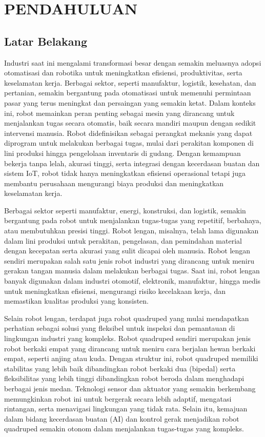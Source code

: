 \chapter{PENDAHULUAN}

\section{Latar Belakang}

Industri saat ini mengalami transformasi besar dengan semakin meluasnya adopsi otomatisasi
dan robotika untuk meningkatkan efisiensi, produktivitas, serta keselamatan kerja.\parencite{Miftachul_podrded}
Berbagai sektor, seperti manufaktur, logistik, kesehatan, dan pertanian, semakin bergantung pada otomatisasi
untuk memenuhi permintaan pasar yang terus meningkat dan persaingan yang semakin ketat.
Dalam konteks ini, robot memainkan peran penting sebagai mesin yang dirancang untuk
menjalankan tugas secara otomatis, baik secara mandiri maupun dengan sedikit intervensi manusia.
Robot didefinisikan sebagai perangkat mekanis yang dapat diprogram untuk melakukan berbagai tugas,
mulai dari perakitan komponen di lini produksi hingga pengelolaan inventaris di gudang.
Dengan kemampuan bekerja tanpa lelah, akurasi tinggi, serta integrasi dengan kecerdasan buatan
dan sistem IoT, robot tidak hanya meningkatkan efisiensi operasional tetapi juga
membantu perusahaan mengurangi biaya produksi dan meningkatkan keselamatan kerja.

Berbagai sektor seperti manufaktur, energi, konstruksi, dan logistik,
semakin bergantung pada robot untuk menjalankan tugas-tugas yang repetitif, berbahaya,
atau membutuhkan presisi tinggi.\parencite{WenhuaYuan_rotifiraotsocimgvc} Robot lengan, misalnya,
telah lama digunakan dalam lini produksi untuk perakitan, pengelasan, dan pemindahan material
dengan kecepatan serta akurasi yang sulit dicapai oleh manusia. Robot lengan sendiri merupakan
salah satu jenis robot industri yang dirancang untuk meniru gerakan tangan manusia dalam
melakukan berbagai tugas. Saat ini, robot lengan banyak digunakan dalam
industri otomotif, elektronik, manufaktur, hingga medis untuk meningkatkan efisiensi,
mengurangi risiko kecelakaan kerja, dan memastikan kualitas produksi yang konsisten.

Selain robot lengan, terdapat juga robot quadruped yang mulai mendapatkan perhatian sebagai
solusi yang fleksibel untuk inspeksi dan pemantauan di lingkungan industri yang kompleks.
Robot quadruped sendiri merupakan jenis robot berkaki empat yang dirancang untuk meniru
cara berjalan hewan berkaki empat, seperti anjing atau kuda.
Dengan struktur ini, robot quadruped memiliki stabilitas yang lebih baik
dibandingkan robot berkaki dua (bipedal) serta fleksibilitas yang lebih tinggi
dibandingkan robot beroda dalam menghadapi berbagai jenis medan. Teknologi sensor
dan aktuator yang semakin berkembang memungkinkan robot ini untuk bergerak
secara lebih adaptif, mengatasi rintangan, serta menavigasi lingkungan yang tidak rata.
Selain itu, kemajuan dalam bidang kecerdasan buatan (AI) dan kontrol gerak
menjadikan robot quadruped semakin otonom dalam menjalankan tugas-tugas yang kompleks.


